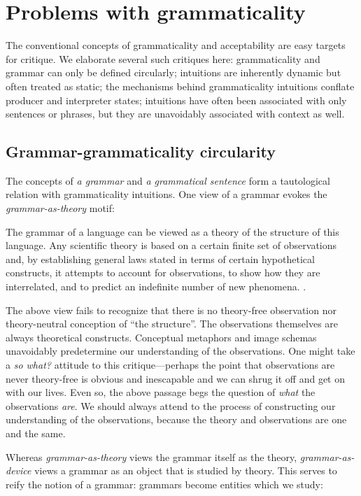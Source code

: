 \section{Problems with grammaticality}

The conventional concepts of grammaticality and acceptability are easy targets for critique. We elaborate several such critiques here: grammaticality and grammar can only be defined circularly; intuitions are inherently dynamic but often treated as static; the mechanisms behind grammaticality intuitions conflate producer and interpreter states; intuitions have often been associated with only sentences or phrases, but they are unavoidably associated with context as well.

\subsection{Grammar-grammaticality circularity}

The concepts of \textit{a grammar} and \textit{a grammatical sentence} form a tautological relation with grammaticality intuitions. One view of a grammar evokes the \textit{grammar-as-theory} motif:

The grammar of a language can be viewed as a theory of the structure of this language. Any scientific theory is based on a certain finite set of observations and, by establishing general laws stated in terms of certain hypothetical constructs, it attempts to account for observations, to show how they are interrelated, and to predict an indefinite number of new phenomena. \citep[113]{Chomsky1956}.

  The above view fails to recognize that there is no theory-free observation nor theory-neutral conception of “the structure”. The observations themselves are always theoretical constructs. Conceptual metaphors and image schemas unavoidably predetermine our understanding of the observations. One might take a \textit{so what?} attitude to this critique—perhaps the point that observations are never theory-free is obvious and inescapable and we can shrug it off and get on with our lives. Even so, the above passage begs the question of \textit{what} the observations \textit{are}. We should always attend to the process of constructing our understanding of the observations, because the theory and observations are one and the same.

  Whereas \textit{grammar-as-theory} views the grammar itself as the theory, \textit{grammar-as-device} views a grammar as an object that is studied by theory. This serves to reify the notion of a grammar: grammars become entities which we study:

